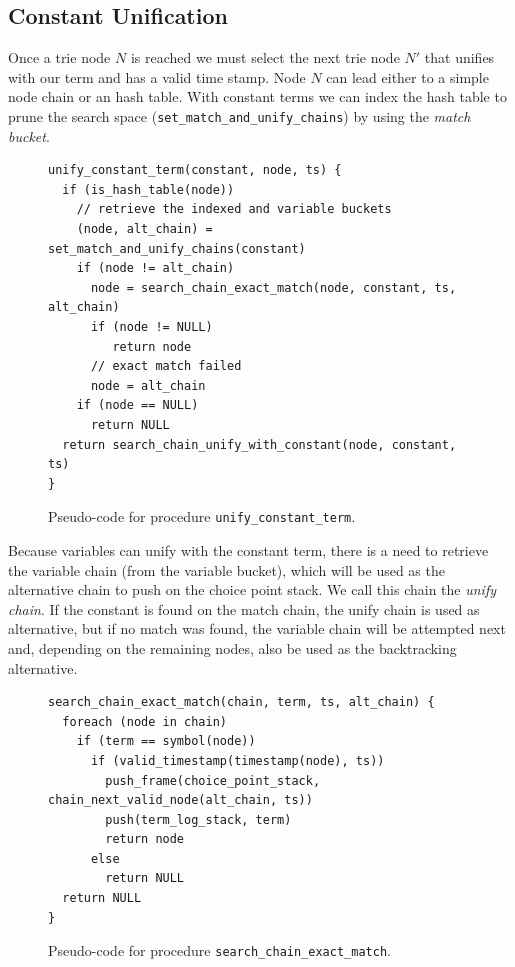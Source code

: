 \subsection{Constant Unification}

Once a trie node $N$ is reached we must select the next trie node $N'$ that unifies with our term and has a valid time stamp. Node $N$ can lead either to a simple node chain or an hash table.
With constant terms we can index the hash table to prune the search space (\texttt{set\_match\_and\_unify\_chains}) by using the \textit{match bucket}.

\begin{figure}[ht]
\begin{Verbatim}
unify_constant_term(constant, node, ts) {
  if (is_hash_table(node))
    // retrieve the indexed and variable buckets
    (node, alt_chain) = set_match_and_unify_chains(constant)
    if (node != alt_chain)
      node = search_chain_exact_match(node, constant, ts, alt_chain)
      if (node != NULL)
         return node
      // exact match failed
      node = alt_chain
    if (node == NULL)
      return NULL
  return search_chain_unify_with_constant(node, constant, ts)
}
\end{Verbatim}
\caption{Pseudo-code for procedure \texttt{unify\_constant\_term}.}
\label{fig:unify_constant_term}
\end{figure}

Because variables can unify with the constant term, there is a need to retrieve the variable chain
(from the variable bucket), which will be used as the alternative chain to push on the choice point stack.
We call this chain the \textit{unify chain}. If the constant is found on the match chain,
the unify chain is used as alternative, but if no match was found, the variable chain will be attempted
next and, depending on the remaining nodes, also be used as the backtracking alternative.

\begin{figure}[ht]
\begin{Verbatim}
search_chain_exact_match(chain, term, ts, alt_chain) {
  foreach (node in chain)
    if (term == symbol(node))
      if (valid_timestamp(timestamp(node), ts))
        push_frame(choice_point_stack, chain_next_valid_node(alt_chain, ts))
        push(term_log_stack, term)
        return node
      else
        return NULL
  return NULL
}
\end{Verbatim}
\caption{Pseudo-code for procedure \texttt{search\_chain\_exact\_match}.}
\label{fig:search_chain_exact_match}
\end{figure}

